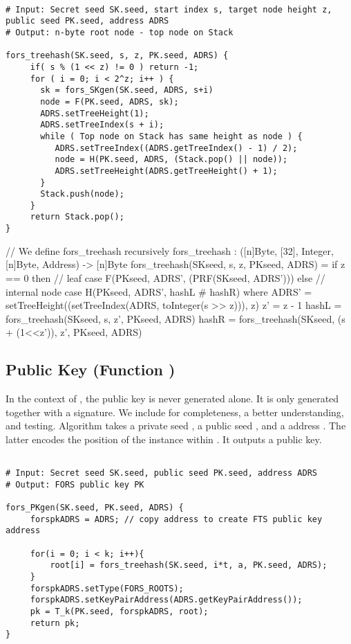    \begin{lstlisting}[breaklines=true, label=algo:forstreehash, language=pseudoc,
                   caption=The \forstreehash algorithm.]

# Input: Secret seed SK.seed, start index s, target node height z, public seed PK.seed, address ADRS
# Output: n-byte root node - top node on Stack

fors_treehash(SK.seed, s, z, PK.seed, ADRS) {
     if( s % (1 << z) != 0 ) return -1;
     for ( i = 0; i < 2^z; i++ ) {
       sk = fors_SKgen(SK.seed, ADRS, s+i) 
       node = F(PK.seed, ADRS, sk);
       ADRS.setTreeHeight(1);
       ADRS.setTreeIndex(s + i);
       while ( Top node on Stack has same height as node ) {
          ADRS.setTreeIndex((ADRS.getTreeIndex() - 1) / 2);
          node = H(PK.seed, ADRS, (Stack.pop() || node));
          ADRS.setTreeHeight(ADRS.getTreeHeight() + 1);
       }
       Stack.push(node);
     }
     return Stack.pop();
}

\end{lstlisting}

\begin{code}
  // We define fors_treehash recursively
  fors_treehash : ([n]Byte, [32], Integer, [n]Byte, Address) -> [n]Byte
  fors_treehash(SKseed, s, z, PKseed, ADRS) =
    if z == 0 then
    // leaf case
      F(PKseed, ADRS', (PRF(SKseed, ADRS')))
    else
      // internal node case
      H(PKseed, ADRS', hashL # hashR)
    where
      ADRS' = setTreeHeight((setTreeIndex(ADRS, toInteger(s >> z))), z)
      z' = z - 1
      hashL = fors_treehash(SKseed, s, z', PKseed, ADRS)
      hashR = fors_treehash(SKseed, (s + (1<<z')), z', PKseed, ADRS)
\end{code}

\subsection{\fors Public Key (Function \forspkgen)}
In the context of \spx, the \fors public key is never generated alone. It is 
only generated together with a signature. We include \forspkgen
for completeness, a better understanding, and testing. Algorithm \forspkgen takes 
a private seed \sseed, a public seed \pseed, and a \fors address \adrs. The 
latter encodes the position of the \fors instance within \spx. It outputs a 
\fors public key.

\begin{lstlisting}[label=alg:fors:pkgen, language=pseudoc,
                   caption=\forspkgen\ -- Generate a FORS public key.]

# Input: Secret seed SK.seed, public seed PK.seed, address ADRS
# Output: FORS public key PK

fors_PKgen(SK.seed, PK.seed, ADRS) {
     forspkADRS = ADRS; // copy address to create FTS public key address

     for(i = 0; i < k; i++){
         root[i] = fors_treehash(SK.seed, i*t, a, PK.seed, ADRS);
     }
     forspkADRS.setType(FORS_ROOTS);
     forspkADRS.setKeyPairAddress(ADRS.getKeyPairAddress());
     pk = T_k(PK.seed, forspkADRS, root);
     return pk;
}
\end{lstlisting}

